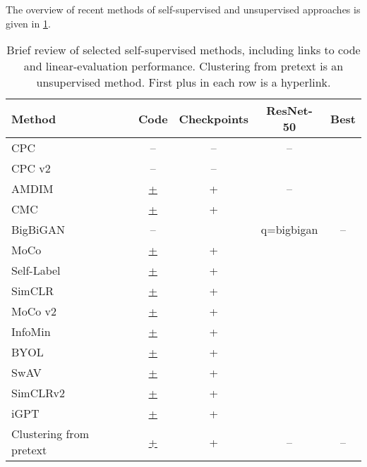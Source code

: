 \documentclass[runningheads]{llncs}
\renewcommand{\cite}[1]{\citep{#1}}
\begin{document}
The overview of recent methods of self-supervised and unsupervised approaches is given in \cref{tab:ss-links}.
\begin{table}
\centering
\caption{Brief review of selected self-supervised methods, including links to code and linear-evaluation performance. Clustering from pretext \cite{gansbeke2020scan} is an unsupervised method. First plus in each row is a  hyperlink. }
\label{tab:ss-links}
\begin{tabular}{lcccc}
\toprule
\textbf{Method}   & \textbf{Code} & \textbf{Checkpoints} & \textbf{ResNet-50}&\textbf{Best}\\ \midrule
CPC \cite{oord2018cpc}&--&--&--&\\ 
CPC v2 \cite{henaff2019cpc2}&--&--&&\\ 
AMDIM \cite{bachman2019amdim}&\href{https://github.com/Philip-Bachman/amdim-public}{+}&+&--&\\ 
CMC \cite{tian2019contrastive}&\href{https://github.com/HobbitLong/CMC/}{+}&+&&\\ 
BigBiGAN \cite{donahue2019bigbigan}&--&\href{https://tfhub.dev/s?publisher=deepmind&q=bigbigan}{+}&--&\\ 
MoCo \cite{he2019moco}&\href{https://github.com/facebookresearch/moco}{+}&+&&\\ 
Self-Label \cite{asano2019selflabelling}&\href{https://github.com/yukimasano/self-label}{+}&+&&\\ 
SimCLR \cite{chen2020simclr}&\href{https://github.com/google-research/simclr}{+}&+&&\\ 
MoCo v2 \cite{chen2020moco2}&\href{https://github.com/facebookresearch/moco}{+}&+&&\\ 
InfoMin \cite{tian2020infomin}&\href{https://github.com/HobbitLong/PyContrast}{+}&+&&\\ 
BYOL \cite{grill2020byol}&\href{https://github.com/deepmind/deepmind-research/tree/master/byol}{+}&+&&\\ 
SwAV \cite{caron2020swav}&\href{https://github.com/facebookresearch/swav}{+}&+&&\\ 
SimCLRv2 \cite{chen2020simclr2}&\href{https://github.com/google-research/simclr}{+}&+&&\\ 
iGPT \cite{chen2020igpt}&\href{https://github.com/openai/image-gpt}{+}&+&&\\ \midrule
Clustering from pretext \cite{gansbeke2020scan}&\href{https://github.com/wvangansbeke/Unsupervised-Classification}{+}&+&--&--\\
 \bottomrule
\end{tabular}
\end{table}
\end{document}
